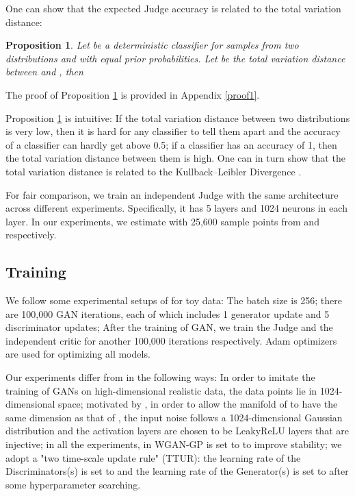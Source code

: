 \documentclass[conference]{IEEEtran}
\newtheorem{prp}{Proposition}
\begin{document}
One can show that the expected Judge accuracy is related to the total variation distance:
\begin{prp}
		Let  be a deterministic classifier for samples from two distributions  and  with equal prior probabilities. Let  be the total variation distance between  and , then
	
	\label{acc_and_tv}
\end{prp}
The proof of Proposition \ref{acc_and_tv} is provided in Appendix \ref{proof1}.

Proposition \ref{acc_and_tv} is intuitive: If the total variation distance between two distributions is very low, then it is hard for any classifier to tell them apart and the accuracy of a classifier can hardly get above 0.5; if a classifier has an accuracy of 1, then the total variation distance between them is high. One can in turn show that the total variation distance is related to the Kullback–Leibler Divergence \cite{tvtokl}.

For fair comparison, we train an independent Judge with the same architecture across different experiments. Specifically, it has 5 layers and 1024 neurons in each layer.
In our experiments, we estimate  with 25,600 sample points from  and  respectively. 

\subsection{Training}
We follow some experimental setups of \cite{improvedwgan} for toy data: The batch size is 256; there are 100,000 GAN iterations, each of which includes 1 generator update and 5 discriminator updates; After the training of GAN, we train the Judge and the independent critic for another 100,000 iterations respectively. Adam optimizers\cite{adam} are used for optimizing all models.

Our experiments differ from \cite{improvedwgan} in the following ways:
In order to imitate the training of GANs on
high-dimensional realistic data, the data points lie in 1024-dimensional space; motivated by \cite{towardsprincipled}, in order to allow the manifold of  to
have the same dimension as that of , the input noise  follows a 1024-dimensional Gaussian distribution and the activation
layers are chosen to be LeakyReLU layers that are injective;
in all the experiments,  in WGAN-GP is set to  to
improve stability; we adopt a "two time-scale update rule"
(TTUR)\cite{FID}: the learning rate of
the Discriminators(s) is set to  and the learning rate of
the Generator(s) is set to  after some hyperparameter
searching.
\end{document}
